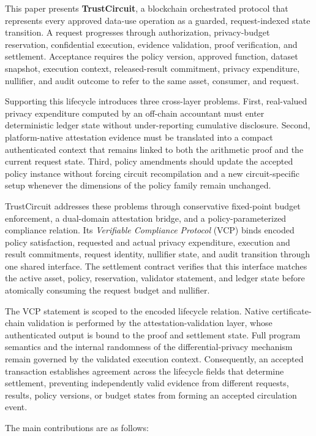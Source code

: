 \documentclass[10pt,journal,compsoc]{IEEEtran}
\begin{document}
This paper presents \textbf{TrustCircuit}, a blockchain orchestrated protocol that represents every approved data-use operation as a guarded, request-indexed state transition. A request progresses through authorization, privacy-budget reservation, confidential execution, evidence validation, proof verification, and settlement. Acceptance requires the policy version, approved function, dataset snapshot, execution context, released-result commitment, privacy expenditure, nullifier, and audit outcome to refer to the same asset, consumer, and request.

Supporting this lifecycle introduces three cross-layer problems. First, real-valued privacy expenditure computed by an off-chain accountant must enter deterministic ledger state without under-reporting cumulative disclosure. Second, platform-native attestation evidence must be translated into a compact authenticated context that remains linked to both the arithmetic proof and the current request state. Third, policy amendments should update the accepted policy instance without forcing circuit recompilation and a new circuit-specific setup whenever the dimensions of the policy family remain unchanged.

TrustCircuit addresses these problems through conservative fixed-point budget enforcement, a dual-domain attestation bridge, and a policy-parameterized compliance relation. Its \emph{Verifiable Compliance Protocol} (VCP) binds encoded policy satisfaction, requested and actual privacy expenditure, execution and result commitments, request identity, nullifier state, and audit transition through one shared interface. The settlement contract verifies that this interface matches the active asset, policy, reservation, validator statement, and ledger state before atomically consuming the request budget and nullifier.

The VCP statement is scoped to the encoded lifecycle relation. Native certificate-chain validation is performed by the attestation-validation layer, whose authenticated output is bound to the proof and settlement state. Full program semantics and the internal randomness of the differential-privacy mechanism remain governed by the validated execution context. Consequently, an accepted transaction establishes agreement across the lifecycle fields that determine settlement, preventing independently valid evidence from different requests, results, policy versions, or budget states from forming an accepted circulation event.

The main contributions are as follows:
\end{document}
